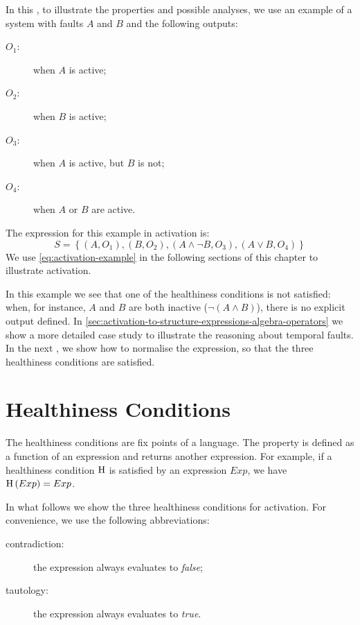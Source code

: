 In this , to illustrate the properties and possible analyses, we use an example of a system with faults $A$ and $B$ and the following outputs:
\begin{description}
  \item[$O_1$:] when $A$ is active;
  \item[$O_2$:] when $B$ is active;
  \item[$O_3$:] when $A$ is active, but $B$ is not;
  \item[$O_4$:] when $A$ or $B$ are active.
\end{description}
%
The expression for this example in \ac{activation} is:
\begin{equation}
S = \left\{\left(A, O_1\right), \left(B, O_2\right), \left(A \land \lnot B, O_3\right), \left(A \lor B, O_4\right)\right\}\label{eq:activation-example}
\end{equation}
%
We use \cref{eq:activation-example} in the following sections of this chapter to illustrate \ac{activation}.

In this example we see that one of the healthiness conditions is not satisfied: when, for instance, $A$ and $B$ are both inactive ($\lnot \left(A \land B\right)$), there is no explicit output defined.
%
In \cref{sec:activation-to-structure-expressions-algebra-operators} we show a more detailed case study to illustrate the reasoning about temporal faults.
In the next , we show how to normalise the expression, so that the three healthiness conditions are satisfied.

\section{Healthiness Conditions}
\label{sec:healthiness-conditions}

The healthiness conditions are fix points of a language.
The property is defined as a function of an expression and returns another expression.
For example, if a healthiness condition $\healthiness$ is satisfied by an expression $Exp$, we have $\healthinessfun{Exp} = Exp$.

In what follows we show the three healthiness conditions for \ac{activation}.
For convenience, we use the following abbreviations:
\begin{description}
  \item[contradiction:] the expression always evaluates to \emph{false};
  \item[tautology:] the expression always evaluates to \emph{true}.
\end{description}

